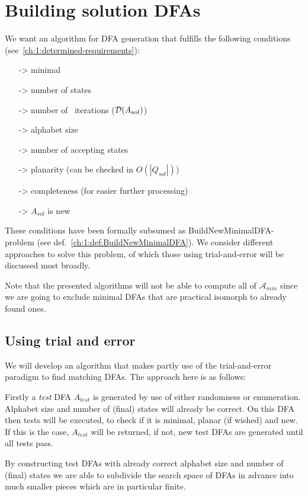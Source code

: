 
\chapter{Building solution DFAs} \label{ch:2}

We want an algorithm for DFA generation that fulfills the following conditions (see~\ref{ch:1:determined-requirements}):
\begin{itemize}
	\item[->] minimal
	\item[->] number of states
	\item[->] number of \CompDist\ iterations ($\mathcal{D}(A_{sol})$)
	\item[->] alphabet size
	\item[->] number of accepting states
	\item[->] planarity (can be checked in $O(|Q_{sol}|)$)
	\item[->] completeness (for easier further processing)
	\item[->] $A_{sol}$ is new
\end{itemize}
These conditions have been formally subsumed as BuildNewMinimalDFA-problem (see def.~\ref{ch:1:def:BuildNewMinimalDFA}). We consider different approaches to solve this problem, of which those using trial-and-error will be discussed most broadly.

Note that the presented algorithms will not be able to compute all of $\mathcal{A}_{min}$ since we are going to exclude minimal DFAs that are practical isomorph to already found ones.

\section{Using trial and error}

We will develop an algorithm that makes partly use of the trial-and-error paradigm to find matching DFAs. The approach here is as follows:

Firstly a \emph{test} DFA $A_{test}$ is generated by use of either randomness or enumeration. Alphabet size and number of (final) states will already be correct. On this DFA then tests will be executed, to check if it is minimal, planar (if wished) and new. If this is the case, $A_{test}$ will be returned, if not, new test DFAs are generated until all tests pass.

By constructing test DFAs with already correct alphabet size and number of (final) states we are able to subdivide the search space of DFAs in advance into much smaller pieces which are in particular finite.

